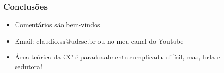 \documentclass[10pt]{beamer}
\begin{document}

\begin{frame}[fragile]
\frametitle{Conclusões}
\begin{itemize}
	\item Comentários são bem-vindos

		\item Email:  claudio.sa@udesc.br ou no meu canal do Youtube
	\pause
	\item Área teórica da CC  é paradoxalmente  complicada--difícil, mas, bela e  sedutora!
\end{itemize}

\end{frame}

\end{document}
